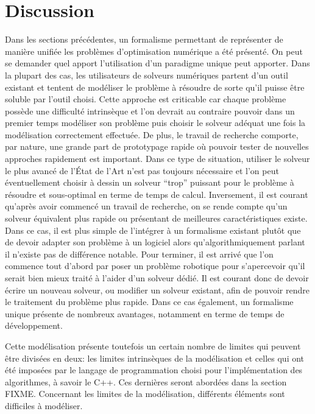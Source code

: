 \section{Discussion}


Dans les sections précédentes, un formalisme permettant de représenter
de manière unifiée les problèmes d'optimisation numérique a été
présenté. On peut se demander quel apport l'utilisation d'un paradigme
unique peut apporter. Dans la plupart des cas, les utilisateurs de
solveurs numériques partent d'un outil existant et tentent de
modéliser le problème à résoudre de sorte qu'il puisse être soluble
par l'outil choisi. Cette approche est criticable car chaque problème
possède une difficulté intrinsèque et l'on devrait au contraire
pouvoir dans un premier temps modéliser son problème puis choisir le
solveur adéquat une fois la modélisation correctement effectuée. De
plus, le travail de recherche comporte, par nature, une grande part de
prototypage rapide où pouvoir tester de nouvelles approches rapidement
est important. Dans ce type de situation, utiliser le solveur le plus
avancé de l'\'Etat de l'Art n'est pas toujours nécessaire et l'on peut
éventuellement choisir à dessin un solveur ``trop'' puissant pour le
problème à résoudre et sous-optimal en terme de temps de
calcul. Inversement, il est courant qu'après avoir commencé un travail
de recherche, on se rende compte qu'un solveur équivalent plus rapide
ou présentant de meilleures caractéristiques existe. Dans ce cas, il
est plus simple de l'intégrer à un formalisme existant plutôt que de
devoir adapter son problème à un logiciel alors qu'algorithmiquement
parlant il n'existe pas de différence notable. Pour terminer, il est
arrivé que l'on commence tout d'abord par poser un problème robotique
pour s'apercevoir qu'il serait bien mieux traité à l'aider d'un
solveur dédié. Il est courant donc de devoir écrire un nouveau
solveur, ou modifier un solveur existant, afin de pouvoir rendre le
traitement du problème plus rapide. Dans ce cas également, un
formalisme unique présente de nombreux avantages, notamment en terme
de temps de développement.


Cette modélisation présente toutefois un certain nombre de limites qui
peuvent être divisées en deux: les limites intrinsèques de la
modélisation et celles qui ont été imposées par le langage de
programmation choisi pour l'implémentation des algorithmes, à savoir
le C++. Ces dernières seront abordées dans la section
FIXME. Concernant les limites de la modélisation, différents éléments
sont difficiles à modéliser.


